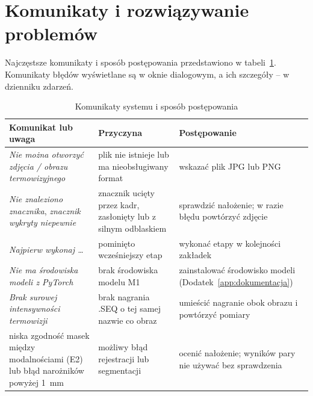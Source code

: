 \section{Komunikaty i rozwiązywanie problemów}

Najczęstsze komunikaty i sposób postępowania przedstawiono w tabeli~\ref{tab:instrukcja-bledy}. Komunikaty błędów wyświetlane są w oknie dialogowym, a ich szczegóły -- w dzienniku zdarzeń.

\begin{table}[!ht]
  \centering
  \caption{Komunikaty systemu i sposób postępowania}
  \label{tab:instrukcja-bledy}
  \footnotesize
  \begin{tabularx}{\textwidth}{>{\raggedright\arraybackslash}p{4.2cm} X X}
    \toprule
    Komunikat lub uwaga & Przyczyna & Postępowanie \\
    \midrule
    \emph{Nie można otworzyć zdjęcia / obrazu termowizyjnego} & plik nie istnieje lub ma nieobsługiwany format & wskazać plik JPG lub PNG \\
    \emph{Nie znaleziono znacznika}, \emph{znacznik wykryty niepewnie} & znacznik ucięty przez kadr, zasłonięty lub z silnym odblaskiem & sprawdzić nałożenie; w razie błędu powtórzyć zdjęcie \\
    \emph{Najpierw wykonaj \ldots} & pominięto wcześniejszy etap & wykonać etapy w kolejności zakładek \\
    \emph{Nie ma środowiska modeli z PyTorch} & brak środowiska modelu M1 & zainstalować środowisko modeli (Dodatek~\ref{app:dokumentacja}) \\
    \emph{Brak surowej intensywności termowizji} & brak nagrania .SEQ o tej samej nazwie co obraz & umieścić nagranie obok obrazu i powtórzyć pomiary \\
    niska zgodność masek między modalnościami (E2) lub błąd narożników powyżej 1~mm & możliwy błąd rejestracji lub segmentacji & ocenić nałożenie; wyników pary nie używać bez sprawdzenia \\
    \bottomrule
  \end{tabularx}
\end{table}
